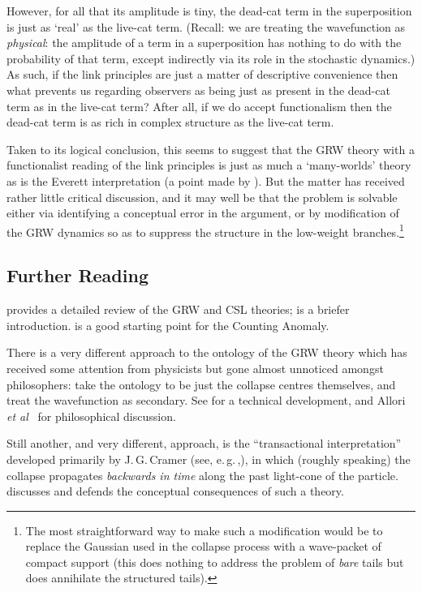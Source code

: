 \documentclass[12pt]{article}
\newcommand{\egc}{\mbox{e.\,g.\,}}
\begin{document}
However, for all that its amplitude is tiny, the dead-cat term in the superposition is just as `real' as the live-cat term. (Recall: we are treating the wavefunction as \emph{physical}: the amplitude of a term in a superposition has nothing to do with the probability of that term, except indirectly via its role in the stochastic dynamics.)  As such, if the link principles are just a matter of descriptive convenience then what prevents us regarding observers as being just as present in the dead-cat term as in the live-cat term? After all, if we do accept functionalism then the dead-cat term is as rich in complex structure as the live-cat term. 


Taken to its logical conclusion, this seems to suggest that the GRW theory with a functionalist reading of the link principles is just as much a `many-worlds' theory as is the Everett interpretation (a point  made by \cite{cordero}). But the matter has received rather little critical discussion, and it may well be that the problem is solvable either via identifying a conceptual error in the argument, or by modification of the GRW dynamics so as to suppress the structure in the low-weight branches.\footnote{The most straightforward way to make such a modification would be to replace the Gaussian used in the collapse process with a wave-packet of compact support (this does nothing to address the problem of \emph{bare} tails but does annihilate the structured tails). }


\subsection{Further Reading}

 provides a detailed review of the GRW and CSL theories;  is a briefer introduction.  is a good starting point for the Counting Anomaly.

There is a very different approach to the ontology of the GRW theory which has received some attention from physicists but gone almost unnoticed amongst philosophers: take the ontology to be just the collapse centres themselves, and treat the wavefunction as secondary. See  for a technical development, and Allori \emph{et al}~\citeyear{goldsteinontology} for philosophical discussion.

Still another, and very different, approach, is the ``transactional interpretation'' developed primarily by J.\,G.\,Cramer (see, \egc,), in which (roughly speaking) the collapse propagates \emph{backwards in time} along the past light-cone of the particle.  discusses and defends the conceptual consequences of such a theory.
\end{document}
